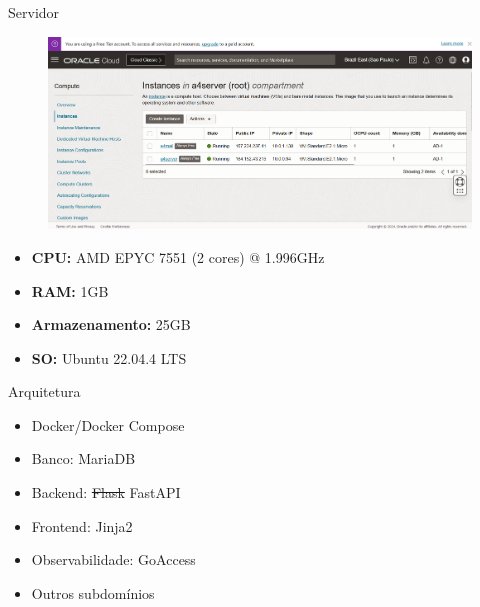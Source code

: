 \documentclass{beamer}
\begin{document}
\begin{frame}{Servidor}
    \begin{figure}[ht]
        \begin{center}
        \includegraphics[width=0.6\linewidth]{img/oracle.png}
        \label{fig:UI}
        \end{center}
    \end{figure}
    \pause
    \begin{itemize}
        \item \textbf{CPU:} AMD EPYC 7551 (2 cores) @ 1.996GHz
        \item \textbf{RAM:} 1GB
        \item \textbf{Armazenamento:} 25GB
        \item \textbf{SO:} Ubuntu 22.04.4 LTS
    \end{itemize}
\end{frame}

\begin{frame}{Arquitetura}
    \begin{itemize}
        \item Docker/Docker Compose
        \item Banco: MariaDB
        \item Backend: \st{Flask} FastAPI
        \item Frontend: Jinja2
        \item Observabilidade: GoAccess
        \item Outros subdomínios
    \end{itemize}
\end{frame}
\end{document}
